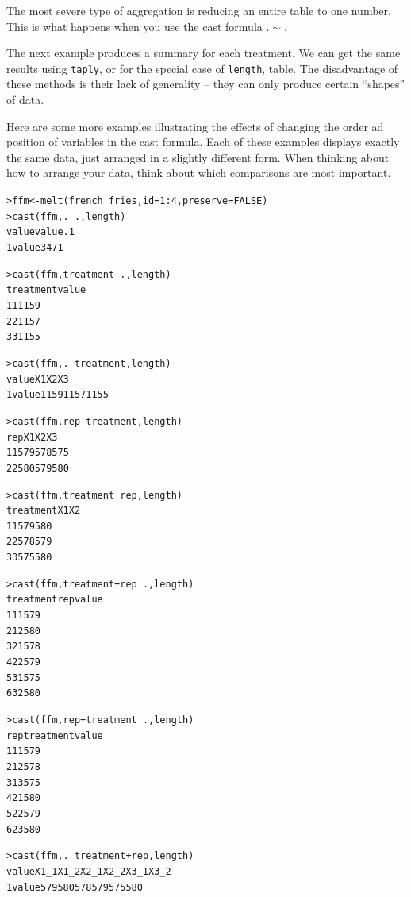 \documentclass[oneside,letterpaper]{scrartcl}
\begin{document}
The most severe type of aggregation is reducing an entire table to one number.  This is what happens when you use the cast formula $. \sim .$ 


The next example produces a summary for each treatment.  We can get the same results using {\tt taply}, or for the special case of {\tt length}, table.  The disadvantage of these methods is their lack of generality -- they can only produce certain ``shapes'' of data.


Here are some more examples illustrating the effects of changing the order ad position of variables in the cast formula.  Each of these examples displays exactly the same data, just arranged in a slightly different form.  When thinking about how to arrange your data, think about which comparisons are most important.

\begin{alltt}
> ffm <- melt(french_fries, id = 1:4, preserve = FALSE)
> cast(ffm, . ~ ., length)
  value value.1
1 value    3471

> cast(ffm, treatment ~ ., length)
  treatment value
1         1  1159
2         2  1157
3         3  1155

> cast(ffm, . ~ treatment, length)
  value   X1   X2   X3
1 value 1159 1157 1155

> cast(ffm, rep ~ treatment, length)
  rep  X1  X2  X3
1   1 579 578 575
2   2 580 579 580

> cast(ffm, treatment ~ rep, length)
  treatment  X1  X2
1         1 579 580
2         2 578 579
3         3 575 580

> cast(ffm, treatment + rep ~ ., length)
  treatment rep value
1         1   1   579
2         1   2   580
3         2   1   578
4         2   2   579
5         3   1   575
6         3   2   580

> cast(ffm, rep + treatment ~ ., length)
  rep treatment value
1   1         1   579
2   1         2   578
3   1         3   575
4   2         1   580
5   2         2   579
6   2         3   580

> cast(ffm, . ~ treatment + rep, length)
  value X1_1 X1_2 X2_1 X2_2 X3_1 X3_2
1 value  579  580  578  579  575  580

\end{alltt}
\end{document}
